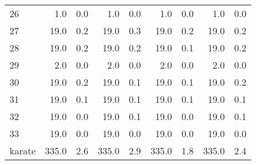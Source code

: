 \begin{tabular}{lrrrrrrrr}
26 & 1.0 & 0.0 & 1.0 & 0.0 & 1.0 & 0.0 & 1.0 & 0.0 \\
27 & 19.0 & 0.2 & 19.0 & 0.3 & 19.0 & 0.2 & 19.0 & 0.2 \\
28 & 19.0 & 0.2 & 19.0 & 0.2 & 19.0 & 0.1 & 19.0 & 0.2 \\
29 & 2.0 & 0.0 & 2.0 & 0.0 & 2.0 & 0.0 & 2.0 & 0.0 \\
30 & 19.0 & 0.2 & 19.0 & 0.1 & 19.0 & 0.1 & 19.0 & 0.2 \\
31 & 19.0 & 0.1 & 19.0 & 0.1 & 19.0 & 0.1 & 19.0 & 0.1 \\
32 & 19.0 & 0.0 & 19.0 & 0.1 & 19.0 & 0.0 & 19.0 & 0.1 \\
33 & 19.0 & 0.0 & 19.0 & 0.0 & 19.0 & 0.0 & 19.0 & 0.0 \\
karate & 335.0 & 2.6 & 335.0 & 2.9 & 335.0 & 1.8 & 335.0 & 2.4 \\
\bottomrule
\end{tabular}
